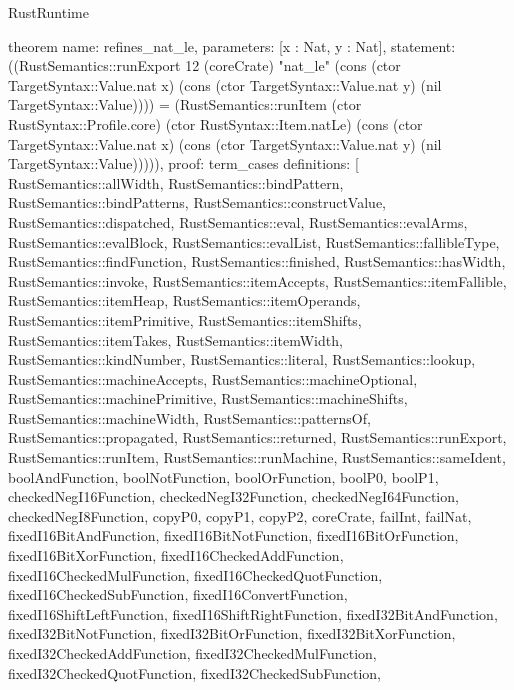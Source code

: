 \begin{lexlean}{RustRuntime}
\begin{semanticmodule}
theorem{
  name: refines_nat_le,
  parameters: [x : Nat, y : Nat],
  statement: ((RustSemantics::runExport 12 (coreCrate) "nat_le" (cons (ctor TargetSyntax::Value.nat x) (cons (ctor TargetSyntax::Value.nat y) (nil TargetSyntax::Value)))) = (RustSemantics::runItem (ctor RustSyntax::Profile.core) (ctor RustSyntax::Item.natLe) (cons (ctor TargetSyntax::Value.nat x) (cons (ctor TargetSyntax::Value.nat y) (nil TargetSyntax::Value))))),
  proof: term_cases{
    definitions: [
      RustSemantics::allWidth,
      RustSemantics::bindPattern,
      RustSemantics::bindPatterns,
      RustSemantics::constructValue,
      RustSemantics::dispatched,
      RustSemantics::eval,
      RustSemantics::evalArms,
      RustSemantics::evalBlock,
      RustSemantics::evalList,
      RustSemantics::fallibleType,
      RustSemantics::findFunction,
      RustSemantics::finished,
      RustSemantics::hasWidth,
      RustSemantics::invoke,
      RustSemantics::itemAccepts,
      RustSemantics::itemFallible,
      RustSemantics::itemHeap,
      RustSemantics::itemOperands,
      RustSemantics::itemPrimitive,
      RustSemantics::itemShifts,
      RustSemantics::itemTakes,
      RustSemantics::itemWidth,
      RustSemantics::kindNumber,
      RustSemantics::literal,
      RustSemantics::lookup,
      RustSemantics::machineAccepts,
      RustSemantics::machineOptional,
      RustSemantics::machinePrimitive,
      RustSemantics::machineShifts,
      RustSemantics::machineWidth,
      RustSemantics::patternsOf,
      RustSemantics::propagated,
      RustSemantics::returned,
      RustSemantics::runExport,
      RustSemantics::runItem,
      RustSemantics::runMachine,
      RustSemantics::sameIdent,
      boolAndFunction,
      boolNotFunction,
      boolOrFunction,
      boolP0,
      boolP1,
      checkedNegI16Function,
      checkedNegI32Function,
      checkedNegI64Function,
      checkedNegI8Function,
      copyP0,
      copyP1,
      copyP2,
      coreCrate,
      failInt,
      failNat,
      fixedI16BitAndFunction,
      fixedI16BitNotFunction,
      fixedI16BitOrFunction,
      fixedI16BitXorFunction,
      fixedI16CheckedAddFunction,
      fixedI16CheckedMulFunction,
      fixedI16CheckedQuotFunction,
      fixedI16CheckedSubFunction,
      fixedI16ConvertFunction,
      fixedI16ShiftLeftFunction,
      fixedI16ShiftRightFunction,
      fixedI32BitAndFunction,
      fixedI32BitNotFunction,
      fixedI32BitOrFunction,
      fixedI32BitXorFunction,
      fixedI32CheckedAddFunction,
      fixedI32CheckedMulFunction,
      fixedI32CheckedQuotFunction,
      fixedI32CheckedSubFunction,
}}
\end{semanticmodule}
\end{lexlean}
